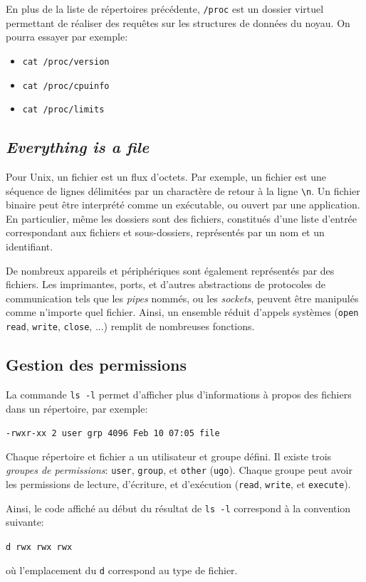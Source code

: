 \documentclass[french, toc]{../cs-classes/cs-classes}
\begin{document}
En plus de la liste de répertoires précédente, \texttt{/proc} est un dossier virtuel permettant de réaliser des requêtes sur les structures de données du noyau. On pourra essayer par exemple:
\begin{itemize}
    \item \texttt{cat /proc/version}
    \item \texttt{cat /proc/cpuinfo}
    \item \texttt{cat /proc/limits}
\end{itemize}

\subsection{\emph{Everything is a file}}
Pour Unix, un fichier est un flux d'octets. Par exemple, un fichier est une séquence de lignes délimitées par un charactère de retour à la ligne \texttt{\textbackslash n}. Un fichier binaire peut être interprété comme un exécutable, ou ouvert par une application. En particulier, même les dossiers sont des fichiers, constitués d'une liste d'entrée correspondant aux fichiers et sous-dossiers, représentés par un nom et un identifiant.

De nombreux appareils et périphériques sont également représentés par des fichiers. Les imprimantes, ports, et d'autres abstractions de protocoles de communication tels que les \emph{pipes} nommés, ou les \emph{sockets}, peuvent être manipulés comme n'importe quel fichier. Ainsi, un ensemble réduit d'appels systèmes (\texttt{open} \texttt{read}, \texttt{write}, \texttt{close}, ...) remplit de nombreuses fonctions.

\subsection{Gestion des permissions}
La commande \texttt{ls -l} permet d'afficher plus d'informations à propos des fichiers dans un répertoire, par exemple:
\begin{center}
    \texttt{-rwxr-xx \phantom{   } 2 user grp 4096 Feb 10 07:05 file}
\end{center}
Chaque répertoire et fichier a un utilisateur et groupe défini. Il existe trois \emph{groupes de permissions}: \texttt{user}, \texttt{group}, et \texttt{other} (\texttt{ugo}). Chaque groupe peut avoir les permissions de lecture, d'écriture, et d'exécution (\texttt{read}, \texttt{write}, et \texttt{execute}).

Ainsi, le code affiché au début du résultat de \texttt{ls -l} correspond à la convention suivante:
\begin{center}
    \texttt{d rwx rwx rwx}
\end{center}
où l'emplacement du \texttt{d} correspond au type de fichier.
\end{document}
